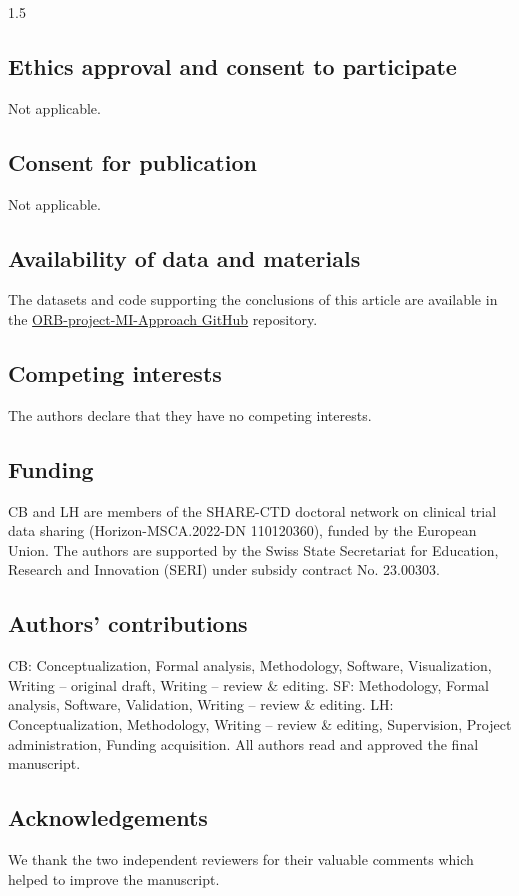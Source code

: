 \documentclass{article}
\begin{document}
\begin{spacing}{1.5}
\subsection*{Ethics approval and consent to participate}
Not applicable.

\subsection*{Consent for publication}
Not applicable.

\subsection*{Availability of data and materials}
The datasets and code supporting the conclusions of this article are available in the \href{https://github.com/cburgwin/ORB-project-MI-Approach/tree/main}{ORB-project-MI-Approach GitHub} repository.

\subsection*{Competing interests}
The authors declare that they have no competing interests.

\subsection*{Funding}
CB and LH are members of the SHARE-CTD doctoral network on clinical trial data sharing (Horizon-MSCA.2022-DN 110120360), funded by the European Union. The authors are supported by the Swiss State Secretariat for Education, Research and Innovation (SERI) under subsidy contract No. 23.00303.

\subsection*{Authors’ contributions}
\noindent
CB: Conceptualization, Formal analysis, Methodology, Software, Visualization, Writing – original draft, Writing – review \& editing. SF: Methodology, Formal analysis, Software, Validation, Writing – review \& editing. LH: Conceptualization, Methodology, Writing – review \& editing, Supervision, Project administration, Funding acquisition. All authors read and approved the final manuscript.

\subsection*{Acknowledgements}
We thank the two independent reviewers for their valuable comments which helped to improve the manuscript.


\sloppy
\printbibliography

\newpage


\end{spacing}
\end{document}
